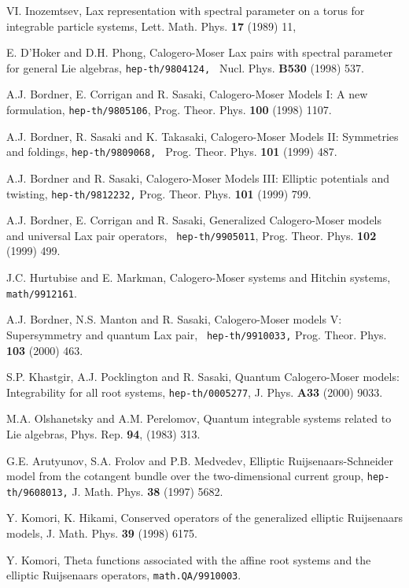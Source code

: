 \documentclass[a4paper,12pt]{article}
\begin{document}
\begin{thebibliography}{99}
  VI. Inozemtsev, Lax representation with spectral parameter on
a torus for integrable particle systems, Lett. Math. Phys.
\textbf{17} (1989) 11,

  E. D'Hoker and D.H. Phong, Calogero-Moser Lax pairs with
spectral parameter for general Lie algebras,
\texttt{hep-th/9804124, } Nucl. Phys. \textbf{B530} (1998)
537.

  A.J. Bordner, E. Corrigan and R. Sasaki, Calogero-Moser
Models I: A new formulation, \texttt{hep-th/9805106}, Prog.
Theor. Phys. \textbf{100} (1998) 1107.

	A.J. Bordner, R. Sasaki and K. Takasaki, Calogero-Moser
Models II: Symmetries and foldings, \texttt{hep-th/9809068,
} Prog. Theor. Phys. \textbf{101} (1999) 487.

	A.J. Bordner and R. Sasaki, Calogero-Moser Models III:
Elliptic potentials and twisting, \texttt{hep-th/9812232,} Prog. Theor.
Phys. \textbf{101} (1999) 799.

	A.J. Bordner, E. Corrigan and R. Sasaki,
Generalized Calogero-Moser models and universal Lax pair operators,
\texttt{ hep-th/9905011}, Prog. Theor. Phys. \textbf{102}
(1999) 499.

  J.C. Hurtubise and E. Markman, Calogero-Moser systems and
Hitchin systems, \texttt{math/9912161}.


  A.J. Bordner, N.S. Manton and R. Sasaki,
Calogero-Moser models V: Supersymmetry and quantum Lax pair,
\texttt{ hep-th/9910033,} Prog. Theor. Phys. \textbf{103}
(2000) 463.


 S.P. Khastgir, A.J. Pocklington and R.
Sasaki, Quantum Calogero-Moser models: Integrability for all
root systems, \texttt{hep-th/0005277}, J. Phys. \textbf{A33}
(2000) 9033.


  M.A. Olshanetsky and A.M. Perelomov, Quantum
integrable  systems related to Lie algebras, Phys.
Rep. \textbf{94}, (1983) 313.

  G.E. Arutyunov, S.A. Frolov and P.B. Medvedev, Elliptic
Ruijsenaars-Schneider model from the cotangent bundle over
the two-dimensional current group, \texttt{hep-th/9608013,}
J. Math. Phys. \textbf{38 }(1997) 5682.

  Y. Komori, K. Hikami, Conserved operators of the generalized
elliptic Ruijsenaars models, J. Math. Phys. \textbf{39}
(1998) 6175.

  Y. Komori, Theta functions associated with the affine root
systems and the elliptic Ruijsenaars operators, \texttt{math.QA/9910003}.


\end{thebibliography}
\end{document}

